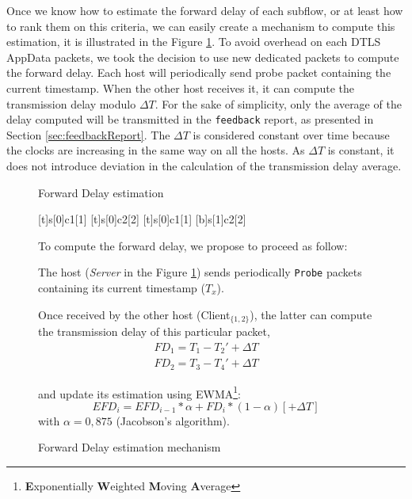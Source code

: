 Once we know how to estimate the forward delay of each subflow, or at least how to rank them on this criteria, we can easily create a mechanism to compute this estimation, it is illustrated in the Figure \ref{fig:forwardDelayComputation}. To avoid overhead on each DTLS AppData packets, we took the decision to use new dedicated packets to compute the forward delay. Each host will periodically send probe packet containing the current timestamp. When the other host receives it, it can compute the transmission delay modulo $\Delta T$. For the sake of simplicity, only the average of the delay computed will be transmitted in the \texttt{feedback} report, as presented in Section \ref{sec:feedbackReport}. The $\Delta T$ is considered constant over time because the clocks are increasing in the same way on all the hosts. As $\Delta T$ is constant, it does not introduce deviation in the calculation of the transmission delay average. 

\begin{figure}[!ht]
\begin{minipage}[c]{.54\linewidth}
\begin{msc}[r]{Forward Delay estimation}

\setlength{\instfootheight}{0em}
\setlength{\instheadheight}{0em}
\setlength{\instdist}{0.25\linewidth}
\setlength{\levelheight}{3em}


[t]{s}[0]{c1}[1]
\nextlevel
{}[t]{s}[0]{c2}[2]
\nextlevel
{}[t]{s}[0]{c1}[1]
[b]{s}[1]{c2}[2]
\nextlevel
{}
\nextlevel
{}
\nextlevel
\end{msc}
\caption{Forward Delay estimation mechanism}
\label{fig:forwardDelayComputation}
\end{minipage}
\begin{minipage}[c]{.44\linewidth}
To compute the forward delay, we propose to proceed as follow:

The host (\textit{Server} in the Figure \ref{fig:forwardDelayComputation}) sends periodically \texttt{Probe} packets containing its current timestamp ($T_x$).

Once received by the other host (Client$_{\{1,2\}}$), the latter can compute the transmission delay of this particular packet,
\begin{align*}
FD_1 = T_1 - T_2' + \Delta{}T\\
FD_2 = T_3 - T_4' + \Delta{}T
\end{align*}

and update its estimation using EWMA\footnote{\textbf{E}xponentially \textbf{W}eighted \textbf{M}oving \textbf{A}verage}:
$$EFD_{i} = EFD_{i-1}*\alpha + FD_i*(1-\alpha) [+ \Delta T]$$
with $\alpha = 0,875$ (Jacobson's algorithm).
\end{minipage}
\end{figure}

